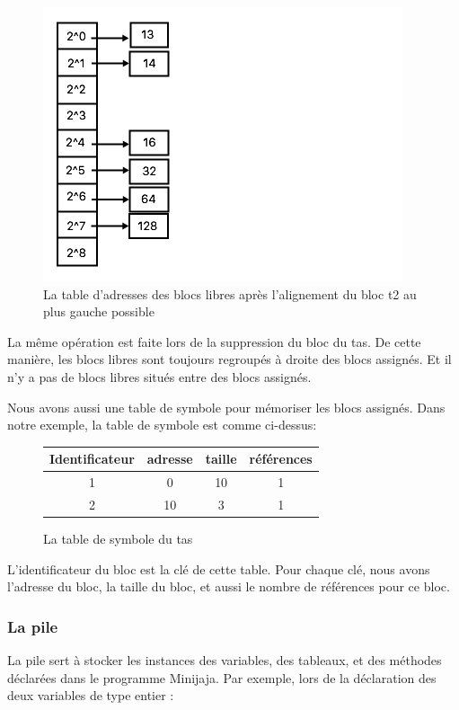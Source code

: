 \documentclass[a4paper,12pt]{report}
\begin{document}
\begin{figure}[H]
\begin{center}
	\includegraphics[scale=0.5]{adress4}
	\caption{La table d'adresses des blocs libres après l'alignement du bloc t2 au plus gauche possible}
\end{center}
\end{figure}

La même opération est faite lors de la suppression du bloc du tas. De cette manière, les blocs libres sont toujours regroupés à droite des blocs assignés. Et il n'y a pas de blocs libres situés entre des blocs assignés.

Nous avons aussi une table de symbole pour mémoriser les blocs assignés. Dans notre exemple, la table de symbole est comme ci-dessus:

\begin{figure}[H]
\begin{center}
	\begin{tabular}{ |c|c|c|c| }
	\hline
	Identificateur & adresse & taille & références \\
	\hline	
	1 & 0 & 10 & 1 \\
	\hline
	2 & 10 & 3 & 1 \\
	\hline
	\end{tabular}
	\caption{La table de symbole du tas}
\end{center}
\end{figure}

L'identificateur du bloc est la clé de cette table. Pour chaque clé, nous avons l'adresse du bloc, la taille du bloc, et aussi le nombre de références pour ce bloc. 


\subsubsection{La pile}
La pile sert à stocker les instances des variables, des tableaux, et des méthodes déclarées dans le programme Minijaja. Par exemple, lors de la déclaration des deux variables de type entier :
\end{document}
